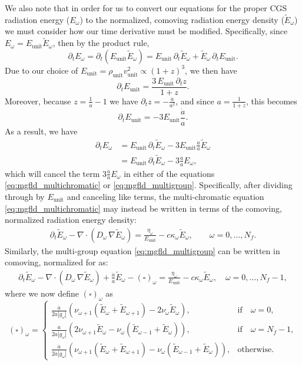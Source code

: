 \documentclass[10pt]{article}
\renewcommand{\(}{\left(}
\renewcommand{\)}{\right)}
\newcommand{\adot}{\dot{a}}
\newcommand{\Dunit}{\rho_{\text{unit}}}
\newcommand{\Vunit}{v_{\text{unit}}}
\newcommand{\Eunit}{E_{\text{unit}}}
\newcommand{\tE}{\tilde{E}}
\begin{document}
We also note that in order for us to convert our equations
for the proper CGS radiation energy ($E_{\omega}$) to the normalized,
comoving radiation energy density ($\tE_{\omega}$) we must consider how our
time derivative must be modified.  Specifically, since $E_{\omega} = \Eunit
\tE_{\omega}$, then by the product rule,
\[
   \partial_t E_{\omega} = \partial_t \left(\Eunit \tE_{\omega}\right) = 
   \Eunit\, \partial_t \tE_{\omega} + \tE_{\omega}\, \partial_t \Eunit.
\]
Due to our choice of $\Eunit = \Dunit \Vunit^2 \propto (1+z)^3$, we then have 
\[
   \partial_t \Eunit = \frac{3\, \Eunit\, \partial_t z}{1+z}.
\]
Moreover, because $z = \frac{1}{a}-1$ we have $\partial_t z =
-\frac{\adot}{a^2}$, and since $a = \frac{1}{1+z}$, this becomes 
\[
   \partial_t \Eunit = -3\Eunit\frac{\adot}{a}.
\]
As a result, we have 
\begin{align*}
   \partial_t E_{\omega} &= \Eunit\, \partial_t \tE_{\omega} - 3\Eunit \frac{\adot}{a} \tE_{\omega} \\
   &= \Eunit\, \partial_t \tE_{\omega} - 3\frac{\adot}{a} E_{\omega},
\end{align*}
which will cancel the term $3 \frac{\adot}{a} E_{\omega}$ in either of the
equations \eqref{eq:mgfld_multichromatic} or
\eqref{eq:mgfld_multigroup}.  Specifically, after dividing through by 
$\Eunit$ and canceling like terms, the multi-chromatic equation
\eqref{eq:mgfld_multichromatic} may instead be written in terms of the
comoving, normalized radiation energy density: 
\begin{align}
  \label{eq:mgfld_multichromatic_Ecomoving}
  \partial_{t} \tE_{\omega} - \nabla\cdot(D_{\omega}\,\nabla \tE_{\omega}) 
    = \frac{\eta_{\omega}}{\Eunit} - c \kappa_{\omega} \tE_{\omega}, \qquad \omega=0,\ldots,N_f.
\end{align}
Similarly, the multi-group equation \eqref{eq:mgfld_multigroup} can be
written in comoving, normalized for as:
\begin{align}
  \label{eq:mgfld_multigroup_Ecomoving}
  \partial_{t} \tE_{\omega} - \nabla\cdot(D_{\omega}\,\nabla \tE_{\omega}) +
    \frac{\adot}{a}\tE_{\omega} - (\square)_{\omega} = \frac{\eta_{\omega}}{\Eunit} - c
    \kappa_{\omega} \tE_{\omega}, \quad \omega=0,\ldots,N_f-1,
\end{align}
where we now define $(\square)_{\omega}$ as 
\begin{equation}
\label{eq:square_omega}
  (\square)_{\omega} = \begin{cases}
    \frac{\adot}{2a|g_{\omega}|}\left(
      \nu_{\omega+1} (\tE_{\omega}+\tE_{\omega+1}) - 2\nu_{\omega} \tE_{\omega}\right),&
      \text{if}\quad \omega=0,\\
    \frac{\adot}{2a|g_{\omega}|}\left(
      2\nu_{\omega+1} \tE_{\omega} - \nu_{\omega} (\tE_{\omega-1}+\tE_{\omega})\right),&
      \text{if}\quad \omega=N_f-1,\\
    \frac{\adot}{2a|g_{\omega}|}\left(
      \nu_{\omega+1} (\tE_{\omega}+\tE_{\omega+1}) - \nu_{\omega}(\tE_{\omega-1}+\tE_{\omega})\right),& 
      \text{otherwise}.
  \end{cases}
\end{equation}
\end{document}
